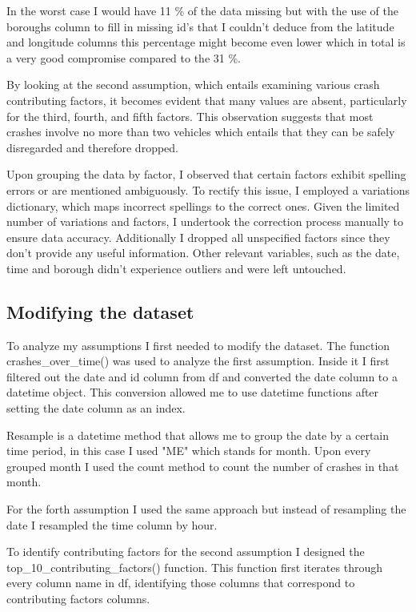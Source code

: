 \documentclass[runningheads]{llncs}
\begin{document}
In the worst case I would have 11 \% of the data missing but with the use of
the boroughs column to fill in missing id's that I couldn't deduce from the latitude and longitude columns
this percentage might become even lower which in total is a very good compromise compared to the 31 \%.

By looking at the second assumption, which entails examining various crash contributing factors, 
it becomes evident that many values are absent, particularly for the third, fourth, and fifth factors. 
This observation suggests that most crashes involve no more than two vehicles which entails that they can be safely
disregarded and therefore dropped.

Upon grouping the data by factor, I observed that certain factors exhibit spelling errors or are mentioned ambiguously. 
To rectify this issue, I employed a variations dictionary, which maps incorrect spellings to the correct ones. 
Given the limited number of variations and factors, I undertook the correction process manually to ensure data accuracy.
Additionally I dropped all unspecified factors since they don't provide any useful information.
Other relevant variables, such as the date, time and borough didn't experience outliers and were left untouched.

\subsection{Modifying the dataset}

To analyze my assumptions I first needed to modify the dataset.
The function crashes\_over\_time() was used to analyze the first assumption.
Inside it I first filtered out the date and id column from df and converted the date column to a datetime object.
This conversion allowed me to use datetime functions after setting the date column as an index.

Resample is a datetime method that allows me to group the date by a certain time period,
in this case I used "ME" which stands for month. Upon every grouped month 
I used the count method to count the number of crashes in that month.

For the forth assumption I used the same approach but instead of resampling the date I resampled the time column by hour.

To identify contributing factors for the second assumption I designed the
top\_10\_contributing\_factors() function.
This function first iterates through every column name in df,
identifying those columns that correspond to contributing factors columns.
\end{document}
